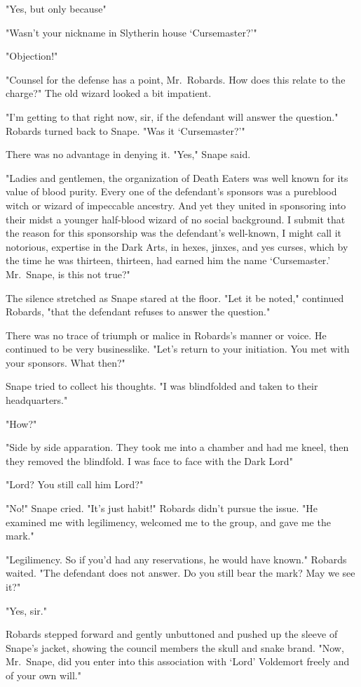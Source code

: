 "Yes, but only because{\el}"

"Wasn't your nickname in Slytherin house `Cursemaster?'"

"Objection!"

"Counsel for the defense has a point, Mr.~Robards. How does this relate to the charge?" The old wizard looked a bit impatient.

"I'm getting to that right now, sir, if the defendant will answer the question." Robards turned back to Snape. "Was it `Cursemaster?'"

There was no advantage in denying it. "Yes," Snape said.

"Ladies and gentlemen, the organization of Death Eaters was well known for its value of blood purity. Every one of the defendant's sponsors was a pureblood witch or wizard of impeccable ancestry. And yet they united in sponsoring into their midst a younger half-blood wizard of no social background. I submit that the reason for this sponsorship was the defendant's well-known, I might call it notorious, expertise in the Dark Arts, in hexes, jinxes, and yes curses, which by the time he was thirteen, thirteen, had earned him the name `Cursemaster.' Mr.~Snape, is this not true?"

The silence stretched as Snape stared at the floor. "Let it be noted," continued Robards, "that the defendant refuses to answer the question."

There was no trace of triumph or malice in Robards's manner or voice. He continued to be very businesslike. "Let's return to your initiation. You met with your sponsors. What then?"

Snape tried to collect his thoughts. "I was blindfolded and taken to their headquarters."

"How?"

"Side by side apparation. They took me into a chamber and had me kneel, then they removed the blindfold. I was face to face with the Dark Lord{\el}"

"Lord? You still call him Lord?"

"No!" Snape cried. "It's just habit!" Robards didn't pursue the issue. "He examined me with legilimency, welcomed me to the group, and gave me the mark."

"Legilimency. So if you'd had any reservations, he would have known." Robards waited. "The defendant does not answer. Do you still bear the mark? May we see it?"

"Yes, sir."

Robards stepped forward and gently unbuttoned and pushed up the sleeve of Snape's jacket, showing the council members the skull and snake brand. "Now, Mr.~Snape, did you enter into this association with `Lord' Voldemort freely and of your own will."

